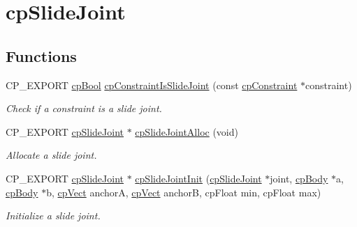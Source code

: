\hypertarget{group__cpSlideJoint}{}\section{cp\+Slide\+Joint}
\label{group__cpSlideJoint}
\subsection*{Functions}
\begin{DoxyCompactItemize}
\item 
\mbox{\label{group__cpSlideJoint_ga8892a1e3507104813a7179002fba2779}} 
C\+P\+\_\+\+E\+X\+P\+O\+RT \hyperlink{group__basicTypes_gabc5e752c48f3449ca26ef413ecbd647e}{cp\+Bool} \hyperlink{group__cpSlideJoint_ga8892a1e3507104813a7179002fba2779}{cp\+Constraint\+Is\+Slide\+Joint} (const \hyperlink{structcpConstraint}{cp\+Constraint} $\ast$constraint)
\begin{DoxyCompactList}\small\item\em Check if a constraint is a slide joint. \end{DoxyCompactList}\item 
\mbox{\label{group__cpSlideJoint_ga3799af68cda5eb57ebc2015aa0e57690}} 
C\+P\+\_\+\+E\+X\+P\+O\+RT \hyperlink{structcpSlideJoint}{cp\+Slide\+Joint} $\ast$ \hyperlink{group__cpSlideJoint_ga3799af68cda5eb57ebc2015aa0e57690}{cp\+Slide\+Joint\+Alloc} (void)
\begin{DoxyCompactList}\small\item\em Allocate a slide joint. \end{DoxyCompactList}\item 
\mbox{\label{group__cpSlideJoint_gac062a00e8ac9d4e2ecd0a6c49db355a1}} 
C\+P\+\_\+\+E\+X\+P\+O\+RT \hyperlink{structcpSlideJoint}{cp\+Slide\+Joint} $\ast$ \hyperlink{group__cpSlideJoint_gac062a00e8ac9d4e2ecd0a6c49db355a1}{cp\+Slide\+Joint\+Init} (\hyperlink{structcpSlideJoint}{cp\+Slide\+Joint} $\ast$joint, \hyperlink{structcpBody}{cp\+Body} $\ast$a, \hyperlink{structcpBody}{cp\+Body} $\ast$b, \hyperlink{structcpVect}{cp\+Vect} anchorA, \hyperlink{structcpVect}{cp\+Vect} anchorB, cp\+Float min, cp\+Float max)
\begin{DoxyCompactList}\small\item\em Initialize a slide joint. \end{DoxyCompactList}\item 

\end{DoxyCompactItemize}

